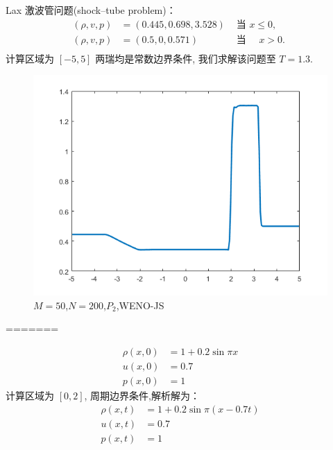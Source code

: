 \documentclass{book}
\begin{document}
\begin{example}
\begin{example}{}{}
\begin{example}
\end{example}
\begin{example}
Lax 激波管问题(shock–tube problem)\cite{RN109}：
\begin{equation}
    \begin{aligned}
        (\rho, v, p) & =(0.445,0.698,3.528) & \text { 当 } x \leqslant 0 \text {, } \\
        (\rho, v, p) & =(0.5,0,0.571) \quad & \text { 当 } \quad x>0 \text {. }     \\
    \end{aligned}
\end{equation}
计算区域为 $[-5,5]$ 两瑞均是常数边界条件, 我们求解该问题至 $T=1.3$.
\begin{figure}[htp]
    \centering
    \label{fig:}
    \includegraphics[width=0.7\linewidth]{fig/lax_problem.png}
    \caption{$M=50$,$N=200$,$P_2$,WENO-JS}
\end{figure}
=======
\begin{example}{}{}
    \begin{equation}
        \begin{aligned}
            \rho(x, 0) & =1+0.2 \sin \pi x \\
            u(x, 0)    & =0.7              \\
            p(x, 0)    & =1
        \end{aligned}
    \end{equation}
    计算区域为 $[0,2]$, 周期边界条件,解析解为：
    \begin{equation}
        \begin{aligned}
            \rho(x, t) & =1+0.2 \sin \pi(x-0.7 t) \\
            u(x, t)    & =0.7                     \\
            p(x, t)    & =1
        \end{aligned}
    \end{equation}



\end{example}
\end{example}
\end{example}
\end{example}
\end{document}
